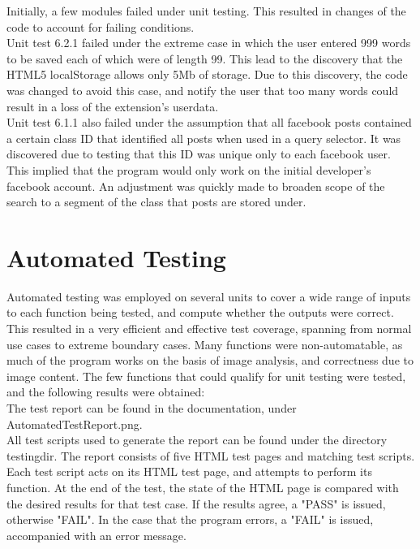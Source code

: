 \documentclass[12pt, titlepage]{article}
\begin{document}
Initially, a few modules failed under unit testing. This resulted in changes of the code to account for failing conditions. \\

Unit test 6.2.1 failed under the extreme case in which the user entered 999 words to be saved each of which were of length 99. This lead to the discovery that the HTML5 localStorage allows only 5Mb of storage. Due to this discovery, the code was changed to avoid this case, and notify the user that too many words could result in a loss of the extension's userdata. \\

Unit test 6.1.1 also failed under the assumption that all facebook posts contained a certain class ID that identified all posts when used in a query selector. It was discovered due to testing that this ID was unique only to each facebook user. This implied that the program would only work on the initial developer's facebook account. An adjustment was quickly made to broaden scope of the search to a segment of the class that posts are stored under. \\

\section{Automated Testing}

Automated testing was employed on several units to cover a wide range of inputs to each function being tested, and compute whether the outputs were correct. This resulted in a very efficient and effective test coverage, spanning from normal use cases to extreme boundary cases. Many functions were non-automatable, as much of the program works on the basis of image analysis, and correctness due to image content. The few functions that could qualify for unit testing were tested, and the following results were obtained:\\

The test report can be found in the documentation, under AutomatedTestReport.png.\\

All test scripts used to generate the report can be found under the directory testingdir. The report consists of five HTML test pages and matching test scripts. Each test script acts on its HTML test page, and attempts to perform its function. At the end of the test, the state of the HTML page is compared with the desired results for that test case. If the results agree, a "PASS" is issued, otherwise "FAIL". In the case that the program errors, a "FAIL" is issued, accompanied with an error message.
		
\end{document}
